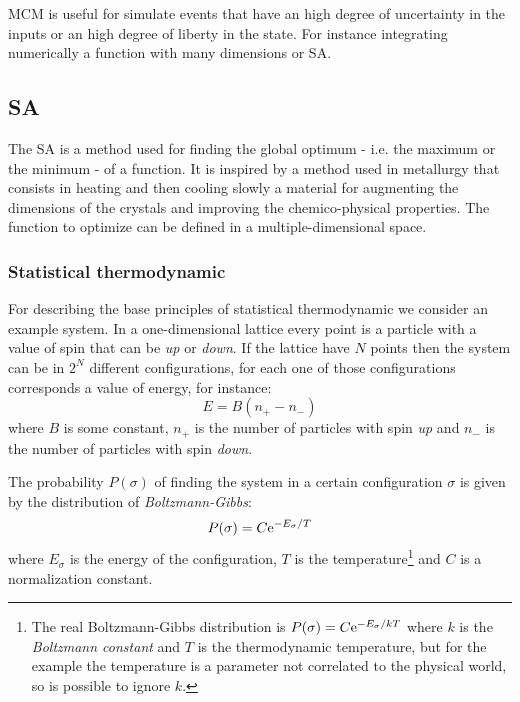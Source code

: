 \documentclass[dissertation.tex]{subfiles}
\begin{document}
\ac{MCM} is useful for simulate events that have an high degree of
uncertainty in the inputs or an high degree of liberty in the
state. For instance integrating numerically a function with many
dimensions or \ac{SA}.

\subsection{\acf{SA}}
The \ac{SA} is a method used for finding the global optimum - i.e. the
maximum or the minimum - of a function. It is inspired by a method
used in metallurgy that consists in heating and then cooling slowly a
material for augmenting the dimensions of the crystals and improving
the chemico-physical properties. The function to optimize can be
defined in a multiple-dimensional space.

\subsubsection{Statistical thermodynamic}
For describing the base principles of statistical thermodynamic we
consider an example system. In a one-dimensional lattice every point
is a particle with a value of spin that can be \emph{up} or
\emph{down}. If the lattice have $N$ points then the system can be in
$2^N$ different configurations, for each one of those configurations
corresponds a value of energy, for instance:
\begin{equation*}
  E=B(n_+-n_-)
\end{equation*}
where $B$ is some constant, $n_+$ is the number of particles with spin
\emph{up} and $n_-$ is the number of particles with spin \emph{down}.

The probability $P(\sigma)$ of finding the system in a certain
configuration $\sigma$ is given by the distribution of
\emph{Boltzmann-Gibbs}:
\begin{equation}\label{eq:distBoltz}
  P(\sigma) = C \mathrm{e}^{-E_\sigma/T}
\end{equation}
where $E_\sigma$ is the energy of the configuration, $T$ is the
temperature\footnote{The real Boltzmann-Gibbs distribution is
  $P(\sigma) = C \mathrm{e}^{-E_\sigma/kT}$ where $k$ is the \emph{Boltzmann
    constant} and $T$ is the thermodynamic temperature, but for the
  example the temperature is a parameter not correlated to the
  physical world, so is possible to ignore $k$.} and $C$ is a
normalization constant.
\end{document}
